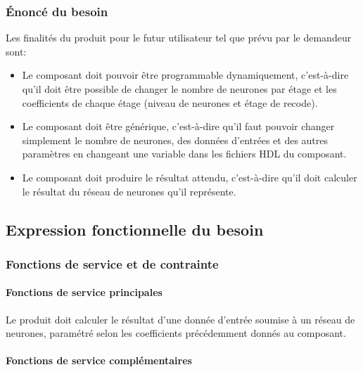 \subsubsection{Énoncé du besoin}
Les finalités du produit pour le futur utilisateur tel que prévu par le
demandeur sont:
\begin{itemize}
	\item Le composant doit pouvoir être programmable dynamiquement, 
		c'est-à-dire qu'il doit être possible de changer le nombre de
		neurones par étage et les coefficients de chaque étage
		(niveau de neurones et étage de recode).
	\item Le composant doit être générique, c'est-à-dire qu'il faut pouvoir
		changer simplement le nombre de neurones, des données d'entrées
		et des autres paramètres en changeant une variable dans les
		fichiers HDL du composant.
	\item Le composant doit produire le résultat attendu, c'est-à-dire qu'il
		doit calculer le résultat du réseau de neurones qu'il représente.
\end{itemize}

\subsection{Expression fonctionnelle du besoin}

\subsubsection{Fonctions de service et de contrainte}

\paragraph{Fonctions de service principales\\}

Le produit doit calculer le résultat d'une donnée d'entrée soumise à un réseau
de neurones, paramétré selon les coefficients précédemment donnés au composant.

\paragraph{Fonctions de service complémentaires\\}

